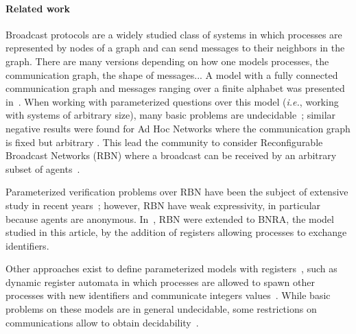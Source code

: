 \paragraph*{Related work} 
Broadcast protocols are a widely studied class of systems in which processes are represented by nodes of a graph and can send messages to their neighbors in the graph. There are many versions depending on how one models processes, the communication graph, the shape of messages... 
A model with a fully connected communication graph and messages ranging over a finite alphabet was presented in~\cite{emerson1998model}. When working with parameterized questions over this model (\emph{i.e.}, working with systems of arbitrary size), many basic problems are undecidable~\cite{EsparzaFM1999verification}; similar negative results were found for Ad Hoc Networks where the communication graph is fixed but arbitrary \cite{DelzannoSZ2010Adhoc}. This lead the community to consider Reconfigurable Broadcast Networks (RBN) where a broadcast can be received by an arbitrary subset of agents~\cite{DelzannoSZ2010Adhoc}.

Parameterized verification problems over RBN have been the subject of extensive study in recent years~\cite{DelzannoSTZ12, Balasubramanian18, BalasubramanianGW22, DBLP:journals/computing/ChiniMS22}; however, RBN have weak expressivity, in particular because agents are anonymous. In~\cite{DelzannoST13}, RBN were extended to BNRA, the model studied in this article, by the addition of registers allowing processes to exchange identifiers. 

Other approaches exist to define parameterized models with registers~\cite{BolligRS21}, such as dynamic register automata in which processes are allowed to spawn other processes with new identifiers and communicate integers values~\cite{AbdullaAKR14}. While basic problems on these models are in general undecidable, some restrictions on communications allow to obtain decidability~\cite{AbdullaAKR15, Rezine17}.

